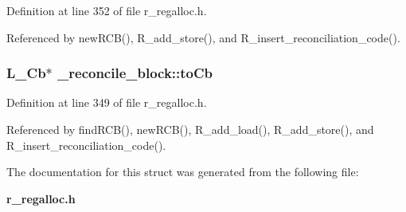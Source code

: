 Definition at line 352 of file r\_\-regalloc.h.

Referenced by new\-RCB(), R\_\-add\_\-store(), and R\_\-insert\_\-reconciliation\_\-code().
\subsubsection{\setlength{\rightskip}{0pt plus 5cm}L\_\-Cb$\ast$ \bf{\_\-reconcile\_\-block::to\-Cb}}\label{struct__reconcile__block_972c3a7bdb64b5d86862b1da1e169ebc}




Definition at line 349 of file r\_\-regalloc.h.

Referenced by find\-RCB(), new\-RCB(), R\_\-add\_\-load(), R\_\-add\_\-store(), and R\_\-insert\_\-reconciliation\_\-code().

The documentation for this struct was generated from the following file:\begin{CompactItemize}
\item 
\bf{r\_\-regalloc.h}\end{CompactItemize}
